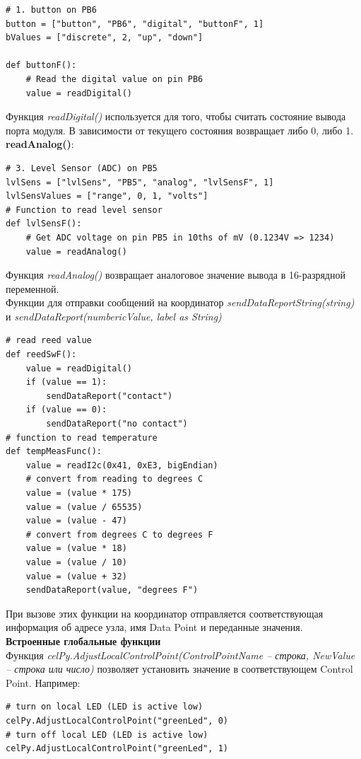 \documentclass[12pt]{article}
\begin{document}
\begin{verbatim}
# 1. button on PB6
button = ["button", "PB6", "digital", "buttonF", 1]
bValues = ["discrete", 2, "up", "down"]

def buttonF():
    # Read the digital value on pin PB6
    value = readDigital()
\end{verbatim}
Функция \emph{readDigital()} используется для того, чтобы считать состояние 
вывода порта модуля. В зависимости от текущего состояния возвращает либо 0, либо 1.\\
\textbf{readAnalog()}:
\begin{verbatim}
# 3. Level Sensor (ADC) on PB5
lvlSens = ["lvlSens", "PB5", "analog", "lvlSensF", 1]
lvlSensValues = ["range", 0, 1, "volts"]
# Function to read level sensor
def lvlSensF():
    # Get ADC voltage on pin PB5 in 10ths of mV (0.1234V => 1234)
    value = readAnalog()
\end{verbatim}
Функция \emph{readAnalog()} возвращает аналоговое значение вывода в 16-разрядной 
переменной.\\
Функции для отправки сообщений на координатор \emph{sendDataReportString(string)}
и \emph{sendDataReport(numbericValue, label as String)}
\begin{verbatim}
# read reed value
def reedSwF():
    value = readDigital()
    if (value == 1):
        sendDataReport("contact")
    if (value == 0):
        sendDataReport("no contact")
# function to read temperature
def tempMeasFunc():
    value = readI2c(0x41, 0xE3, bigEndian)
    # convert from reading to degrees C
    value = (value * 175)
    value = (value / 65535)
    value = (value - 47)
    # convert from degrees C to degrees F
    value = (value * 18)
    value = (value / 10)
    value = (value + 32)
    sendDataReport(value, "degrees F")
\end{verbatim}
При вызове этих функции на координатор отправляется соответствующая информация 
об адресе узла, имя Data Point и переданные значения.\\
\textbf{Встроенные глобальные функции}\\
Функция \emph{celPy.AdjustLocalControlPoint(ControlPointName – строка, NewValue 
– строка или число)} позволяет установить значение в соответствующем Control Point.
Например:
\begin{verbatim}
# turn on local LED (LED is active low)
celPy.AdjustLocalControlPoint("greenLed", 0)
# turn off local LED (LED is active low)
celPy.AdjustLocalControlPoint("greenLed", 1)
\end{verbatim}
\end{document}
